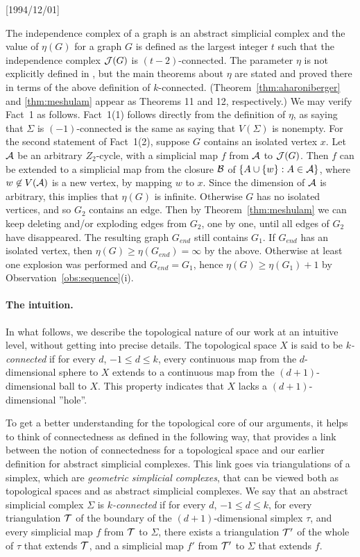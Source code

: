 \NeedsTeXFormat{LaTeX2e}[1994/12/01]\documentclass[letterpaper, 11pt]{article}
\theoremstyle{definition}
\theoremstyle{remark}
\numberwithin{equation}{section}
\begin{document}
The independence complex of a graph is an abstract simplicial complex
and the value of $\eta (G)$ for a graph $G$ is defined as the
largest integer $t$ such that the independence complex
${\cal J}(G)$ is $(t-2)$-connected. The parameter $\eta$ is not
explicitly defined in \cite{haxell2}, but the main theorems about
$\eta$ are stated and proved there in terms of the above
definition of $k$-connected. (Theorem~\ref{thm:aharoniberger} and
\ref{thm:meshulam} appear 
as Theorems 11 and 12, respectively.) We may verify Fact~1 as
follows. Fact~1(1) follows directly from 
the definition of $\eta$, as saying that $\Sigma$ is $(-1)$-connected is the 
same as saying that $V(\Sigma)$ is nonempty. For the second statement of
Fact~1(2), suppose $G$ contains an isolated vertex $x$. Let ${\cal A}$ be an
arbitrary $Z_2$-cycle, with a simplicial map $f$ from ${\cal A}$ to ${\cal
  J}(G)$. Then $f$ can be extended to a simplicial map from the
closure ${\cal B}$ of
$\{ A\cup \{w \} : A \in {\cal A}\}$, where $w\not \in
V({\cal A})$ is a new vertex, by mapping $w$ to $x$.  Since the
dimension of ${\cal A}$ is arbitrary, this implies that $\eta (G)$ is
infinite. Otherwise $G$ has no isolated vertices, and so $G_2$ contains an edge.  Then by Theorem~\ref{thm:meshulam} we can keep
deleting  and/or exploding edges from $G_2$, one by one, until all
edges of $G_2$ have disappeared. The resulting graph $G_{end}$ still
contains $G_1$. If $G_{end}$ has an
isolated vertex, then $\eta (G) \geq \eta (G_{end}) = \infty$ by the
above. Otherwise at least one explosion was performed and
$G_{end}=G_1$, hence $\eta (G) \geq \eta (G_1) + 1$ 
by Observation~\ref{obs:sequence}(i).



\paragraph{The intuition.}
In what follows, we describe the topological nature
of our work at an intuitive level, without getting into precise
details.
The topological space $X$ is said to be {\em $k$-connected} if for every $d$,
$-1 \leq d \leq k$, every continuous map from the $d$-dimensional
sphere to $X$ extends to a continuous map from the $(d+1)$-dimensional
ball to $X$. This property indicates that $X$ lacks a $(d+1)$-dimensional
''hole''.

To get a better understanding for the topological core of our
arguments, it helps to think of connectedness as defined in the
following way, that provides a link between the notion of
connectedness for a topological space and our earlier definition for
abstract simplicial complexes. This link goes via triangulations of a
simplex, which are {\em geometric simplicial complexes}, that can be
viewed both as topological spaces and as abstract simplicial complexes.
We say that an abstract simplicial complex $\Sigma$ is
{\em $k$-connected} if for every $d$, $-1 \leq d\leq k$, for every
triangulation ${\cal T}$ of the boundary of the $(d+1)$-dimensional
simplex $\tau$, and every simplicial map $f$ from ${\cal T}$ to
$\Sigma$, there exists a triangulation ${\cal T}'$ of the whole of
$\tau$ that extends 
${\cal T}$, and a simplicial map $f'$ from ${\cal T}'$ to $\Sigma$ that
extends $f$.
\end{document}
